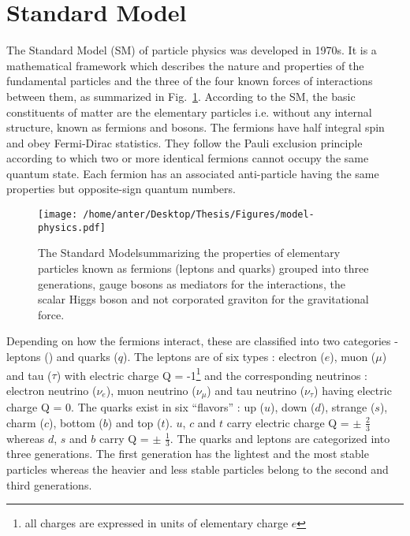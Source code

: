\section{Standard Model}
The Standard Model (SM) of particle physics \cite{Perkins:1982xb,Herrero:1998eq,Weinberg:1967tq} was developed in 1970s. It is a mathematical framework which describes the nature and properties of the fundamental particles and the three of the four known forces of interactions between them, as summarized in Fig.~\ref{fig:SM}. According to the SM, the basic constituents of matter are the elementary particles i.e. without any internal structure, known as fermions and bosons. The fermions have half integral spin and obey Fermi-Dirac statistics. They follow the Pauli exclusion principle according to which two or more identical fermions cannot occupy the same quantum state. Each fermion has an associated anti-particle having the same properties but opposite-sign quantum numbers.
\begin{figure}[!h]
\begin{center}
\hspace*{-15mm}
\texttt{[image: /home/anter/Desktop/Thesis/Figures/model-physics.pdf]}\\
\caption[The Standard Model summarizing the properties of elementary particles and their forces of interaction.]{The Standard Model\footnotemark summarizing the properties of elementary particles known as fermions (leptons and quarks) grouped into three generations, gauge bosons as mediators for the interactions, the scalar Higgs boson and not corporated graviton for the gravitational force.}
\label{fig:SM}
\end{center}
\end{figure}

Depending on how the fermions interact, these are classified into two categories - leptons (\sln) and quarks ($q$). The leptons are of six types : electron ($e$), muon ($\mu$) and tau ($\tau$) with electric charge Q = -1\footnote{all charges are expressed in units of elementary charge $e$} and the corresponding neutrinos : electron neutrino ($\nu_e$), muon neutrino ($\nu_\mu$) and tau neutrino ($\nu_\tau$) having electric charge Q = 0. The quarks exist in six ``flavors'' : up ($u$), down ($d$), strange ($s$), charm ($c$), bottom ($b$) and top ($t$). $u$, $c$ and $t$ carry electric charge Q = $\pm$ $\frac{2}{3}$ whereas $d$, $s$ and $b$ carry Q = $\pm$ $\frac{1}{3}$. The quarks and leptons are categorized into three generations. The first generation has the lightest and the most stable particles whereas the heavier and less stable particles belong to the second and third generations.

